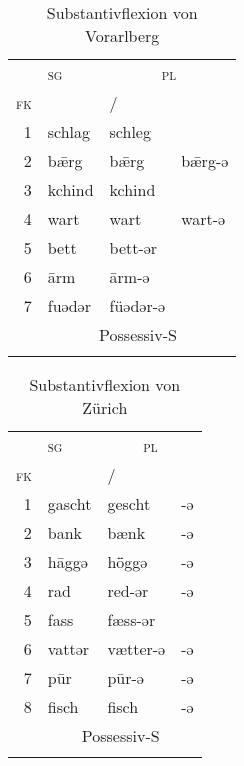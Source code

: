 
\begin{table}[H]
	\caption{Substantivflexion von Vorarlberg \citep[231-261]{Jutz1925}}\label{table9}
	\begin{tabular}{rlll}
		\lsptoprule
		& \textsc{sg} & \multicolumn{2}{c}{\textsc{pl}}\\\cmidrule(lr){3-4}
		\textsc{fk} &  & \NOM\slash\AKK & \DAT\\\midrule
		1 & schlag & schleg & \\
		2 & bǣrg & bǣrg & bǣrg-ə\\
		3 & kchind & kchind & \\
		4 & wart & wart & wart-ə\\
		5 & bett & bett-ər & \\
		6 & \=arm & \=arm-ə & \\
		7 & fuədər & füədər-ə & \\
		& \multicolumn{3}{c}{Possessiv-S}\\
		\lspbottomrule
	\end{tabular}
\end{table}


\begin{table}[H]
	\caption{Substantivflexion von Zürich \citep[108-119]{Weber1987}}\label{table10}
	\begin{tabular}{rlll}\lsptoprule
		& \textsc{sg} & \multicolumn{2}{c}{\textsc{pl}}\\\cmidrule(lr){3-4}
		\textsc{fk} &  & \NOM\slash\AKK & \DAT\\\midrule
		1 & gascht & gescht & {}-ə\\
		2 & bank & bænk & {}-ə\\
		3 & h\=aggə & hȫggə & {}-ə\\
		4 & rad & red-ər & {}-ə\\
		5 & fass & fæss-ər & \\
		6 & vattər & vætter-ə & {}-ə\\
		7 & p\=ur & p\=ur-ə & {}-ə\\
		8 & fisch & fisch & {}-ə\\
		& \multicolumn{3}{c}{Possessiv-S}\\
		\lspbottomrule
	\end{tabular}
\end{table}


